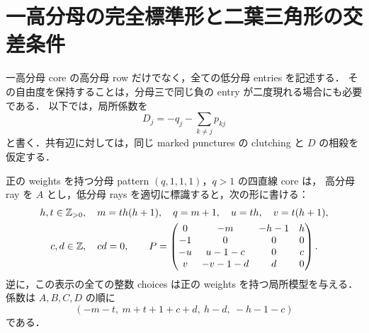 
\section{一高分母の完全標準形と二葉三角形の交差条件}
\label{tl15:section}

一高分母 core の高分母 row だけでなく，全ての低分母 entries を記述する．
その自由度を保持することは，分母三で同じ負の entry が二度現れる場合にも必要である．
以下では，局所係数を
\[
 D_j=-q_j-\sum_{k\ne j}p_{kj}
\]
と書く．共有辺に対しては，同じ marked punctures の clutching と
$D$ の相殺を仮定する．

\begin{proposition}
\label{tl15:one-high-full}
正の weights を持つ分母 pattern $(q,1,1,1)$，$q>1$ の四直線 core は，
高分母 ray を $A$ とし，低分母 rays を適切に標識すると，次の形に書ける：
\begin{equation}\label{tl15:leaf-matrix}
\begin{gathered}
 h,t\in\mathbb Z_{>0},\quad m=th(h+1),\quad q=m+1,\quad
 u=th,\quad v=t(h+1),\\
 c,d\in\mathbb Z,\quad cd=0,\qquad
 P=\begin{pmatrix}
 0&-m&-h-1&h\\
 -1&0&0&0\\
 -u&u-1-c&0&c\\
 v&-v-1-d&d&0
 \end{pmatrix}.
\end{gathered}
\end{equation}
逆に，この表示の全ての整数 choices は正の weights を持つ局所模型を与える．
係数は $A,B,C,D$ の順に
\begin{equation}\label{tl15:leaf-D}
 (-m-t,\ m+t+1+c+d,\ h-d,\ -h-1-c)
\end{equation}
である．
\end{proposition}

